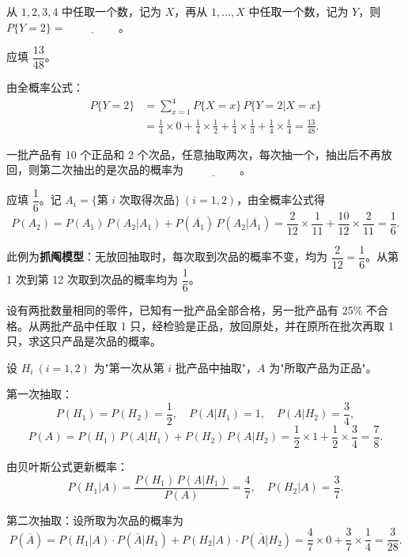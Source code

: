 \documentclass[lang=cn,11pt]{elegantbook}
\begin{document}
\begin{exercise}\label{exer:1-14}
从 \(1, 2, 3, 4\) 中任取一个数，记为 \(X\)，再从 \(1, \dots, X\) 中任取一个数，记为 \(Y\)，则 \(P\{Y=2\}=\underline{\hspace{2cm}}\)。
\end{exercise}

\begin{solution}
应填 \(\dfrac{13}{48}\)。

由全概率公式：
\[
\begin{aligned}
P\{Y=2\} &= \sum_{x=1}^{4} P\{X=x\}\,P\{Y=2|X=x\} \\
&= \frac{1}{4} \times 0 + \frac{1}{4} \times \frac{1}{2} + \frac{1}{4} \times \frac{1}{3} + \frac{1}{4} \times \frac{1}{4} = \frac{13}{48}.
\end{aligned}
\]
\end{solution}


\begin{exercise}\label{exer:1-15}
一批产品有 10 个正品和 2 个次品，任意抽取两次，每次抽一个，抽出后不再放回，则第二次抽出的是次品的概率为 \(\underline{\hspace{2cm}}\)。
\end{exercise}

\begin{solution}
应填 \(\dfrac{1}{6}\)。记 \(A_i=\{\text{第 }i\text{ 次取得次品}\}\ (i=1,2)\)，由全概率公式得
\[
P(A_2) = P(A_1)\,P(A_2|A_1) + P(\overline{A_1})\,P(A_2|\overline{A_1}) = \frac{2}{12} \times \frac{1}{11} + \frac{10}{12} \times \frac{2}{11} = \frac{1}{6}.
\]
\end{solution}

\begin{note}
此例为\textbf{抓阄模型}：无放回抽取时，每次取到次品的概率不变，均为 \(\dfrac{2}{12} = \dfrac{1}{6}\)。从第 1 次到第 12 次取到次品的概率均为 \(\dfrac{1}{6}\)。
\end{note}

\begin{exercise}\label{exer:1-16}
设有两批数量相同的零件，已知有一批产品全部合格，另一批产品有 25\% 不合格。从两批产品中任取 1 只，经检验是正品，放回原处，并在原所在批次再取 1 只，求这只产品是次品的概率。
\end{exercise}

\begin{solution}
设 \(H_i\ (i=1,2)\) 为"第一次从第 \(i\) 批产品中抽取"，\(A\) 为"所取产品为正品"。

第一次抽取：
\[
P(H_1)=P(H_2)=\frac{1}{2},\quad P(A|H_1)=1,\quad P(A|H_2)=\frac{3}{4},
\]
\[
P(A) = P(H_1)\,P(A|H_1) + P(H_2)\,P(A|H_2) = \frac{1}{2} \times 1 + \frac{1}{2} \times \frac{3}{4} = \frac{7}{8}.
\]

由贝叶斯公式更新概率：
\[
P(H_1|A) = \frac{P(H_1)\,P(A|H_1)}{P(A)} = \frac{4}{7}, \quad P(H_2|A) = \frac{3}{7}.
\]

第二次抽取：设所取为次品的概率为
\[
P(\overline{A}) = P(H_1|A) \cdot P(\overline{A}|H_1) + P(H_2|A) \cdot P(\overline{A}|H_2) = \frac{4}{7} \times 0 + \frac{3}{7} \times \frac{1}{4} = \frac{3}{28}.
\]
\end{solution}
\end{document}
